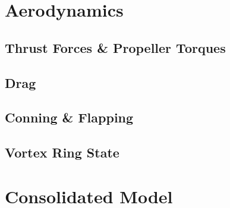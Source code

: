 \section{Aerodynamics}
\label{sec:dynamics.aero}
\subsection{Thrust Forces \& Propeller Torques}
\label{subsec:dynamics.aero.bem}
\subsection{Drag}
\label{subsec:dynamics.aero.drag}
\subsection{Conning \& Flapping}
\label{subsec:dynamics.aero.flap}
\subsection{Vortex Ring State}
\label{subsec:dynamics.aero.vrs}

\section{Consolidated Model}
\label{sec:dynamics.model}